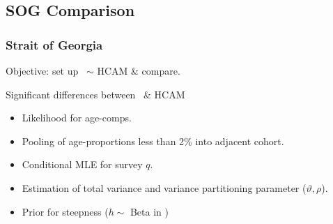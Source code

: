 \subsection{SOG Comparison} %
\label{sub:sog_comparison}
\begin{frame}[t]\frametitle{Strait of Georgia}
	Objective: set up \iscam\ $\sim$ HCAM \& compare.
	\begin{alertblock}
		{Significant differences between \iscam\ \& HCAM}
		\begin{itemize}
			\item<+-> Likelihood for age-comps.
			\item<1-> Pooling of age-proportions less than 2\% into adjacent cohort.
			\item<+-> Conditional MLE for survey $q$.
			\item<+-> Estimation of total variance and variance partitioning parameter ($\vartheta, \rho$).
			\item<+-> Prior for steepness ($h \sim$ Beta in \iscam)
		\end{itemize}
	\end{alertblock}
\end{frame}
%
